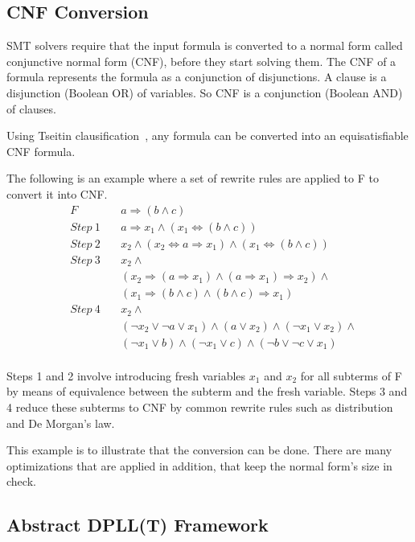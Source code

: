 \documentclass{article}
\begin{document}
\subsection{CNF Conversion}
\label{sec:cnf}
\begin{framed}
SMT solvers require that the input formula is converted to a 
normal form called conjunctive normal form (CNF), before they 
start solving them. The CNF of a formula represents the 
formula as a conjunction of disjunctions. A clause is a 
disjunction (Boolean OR) of variables. So CNF is a 
conjunction (Boolean AND) of clauses. 
\end{framed}

Using Tseitin clausification~\cite{BEL01Handbook}, any formula 
can be converted into an equisatisfiable CNF formula.

The following is an example where a set of rewrite rules
are applied to F to convert it into CNF. 
\begin{align*}
	&F&\ &a \Rightarrow (b \land c) \\
	&Step\ 1&\ &a \Rightarrow x_1 
		\land (x_1 \iff (b \land c)) \\
	&Step\ 2&\ &x_2 \land (x_2 \iff a \Rightarrow x_1) 
		\land (x_1 \iff (b \land c)) \\
	&Step\ 3&\ &x_2 \land \\
	& & &(x_2 \Rightarrow (a \Rightarrow x_1) \land 
		(a \Rightarrow x_1) \Rightarrow x_2) \land \\
	& & &(x_1 \Rightarrow (b \land c) \land 
		(b \land c) \Rightarrow x_1) \\
	&Step\ 4&\ &x_2 \land \\
	& & &(\neg x_2 \lor \neg a \lor x_1) \land 
		(a \lor x_2) \land (\neg x_1 \lor x_2) \land \\
	& & &(\neg x_1 \lor b) \land (\neg x_1 \lor c) \land 
		(\neg b \lor \neg c \lor x_1) \\
\end{align*}

Steps 1 and 2 involve introducing fresh variables $x_1$
and $x_2$ for all subterms of F by means of equivalence 
between the subterm and the fresh variable. Steps 3 and 4 
reduce these subterms to CNF by common rewrite rules 
such as distribution and De Morgan's law.

This example is to illustrate that the conversion can be done.
There are many optimizations that are applied in addition, 
that keep the normal form's size in check.


\subsection{Abstract DPLL(T) Framework}
\label{sec:trans}
\end{document}
